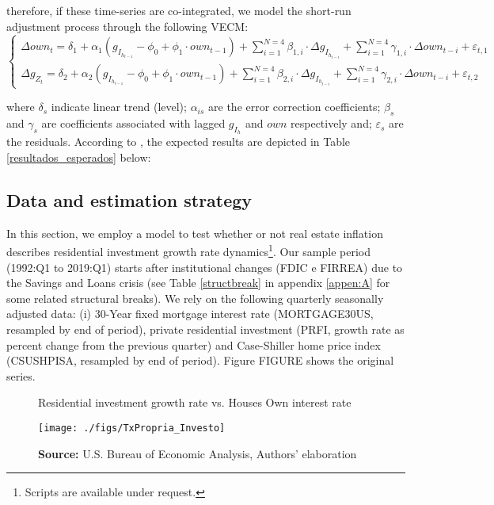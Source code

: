 \documentclass[11pt]{article}
\begin{document}
therefore, if these time-series are co-integrated, we model the short-run adjustment process through the following VECM:
\begin{equation}
\begin{cases}
\Delta own_t = \delta_{1} + \alpha_1\left(g_{I_{h_{t-1}}} - \phi_0 + \phi_1\cdot own_{t-1}\right) + {\sum^{N=4}_{i=1}}\beta_{1,i}\cdot \Delta g_{I_{h_{t-i}}} +
\sum^{N=4}_{i=1}\gamma_{1,i}\cdot \Delta own_{t-i} +\varepsilon_{t,1}
\\
\Delta g_{Z_{t}} = \delta_{2} + \alpha_2\left(g_{I_{h_{t-1}}} - \phi_0 + \phi_1\cdot own_{t-1}\right) + \sum^{N=4}_{i=1}\beta_{2,i}\cdot \Delta g_{I_{h_{t-i}}} +
\sum^{N=4}_{i=1}\gamma_{2,i}\cdot \Delta own_{t-i} +\varepsilon_{t,2}
\end{cases}
\end{equation}

where \(\delta_s\) indicate linear trend (level);
\(\alpha_{is}\) are the error correction coefficients; 
\(\beta_s\) and \(\gamma_s\) are coefficients associated with lagged \(g_{I_h}\) and \(own\) respectively and; \(\varepsilon_s\) are the residuals.
According to \textcite{teixeira_crescimento_2015}, the expected results are depicted in Table \ref{resultados_esperados} below:



\subsection{Data and estimation strategy}
\label{sec:orge68820c}
\label{sec:estimation}


In this section, we employ a model to test whether or not real estate inflation describes residential investment growth rate dynamics\footnote{Scripts are available under request.}.
Our sample period (1992:Q1 to 2019:Q1) starts after institutional changes (FDIC e
FIRREA) due to the Savings and Loans crisis (see Table \ref{structbreak} in appendix \ref{appen:A} for some related structural breaks). 
We rely on the following  quarterly seasonally adjusted data: (i) 30-Year fixed mortgage interest rate (MORTGAGE30US, resampled by end of period), private residential investment (PRFI, growth rate as percent change from the previous quarter) and Case-Shiller home price index
(CSUSHPISA, resampled by end of period). Figure FIGURE shows the original series.

\begin{figure}[htb]
	\centering
	\caption{Residential investment growth rate vs. Houses Own interest rate}
	\label{propria_investo}
	\texttt{[image: ./figs/TxPropria\_Investo]}
	\caption*{\textbf{Source:} U.S. Bureau of Economic Analysis, Authors' elaboration}
\end{figure}
\end{document}
